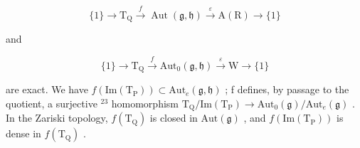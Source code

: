 \[
\{1 \} \longrightarrow \mathrm {T_ {Q}} \stackrel {{f}} {{\longrightarrow}} \operatorname{Aut} (\mathfrak {g}, \mathfrak {h}) \stackrel {{\varepsilon}} {{\longrightarrow}} \mathrm{A(R)} \longrightarrow \{1 \}
\]

and

\[
\{1 \} \longrightarrow \mathrm{T} _ {\mathrm{Q}} \stackrel {f} {\longrightarrow} \mathrm{Aut} _ {0} (\mathfrak {g}, \mathfrak {h}) \stackrel {\varepsilon} {\longrightarrow} \mathrm{W} \longrightarrow \{1 \}
\]

are exact. We have \(f(\mathrm{Im}(\mathrm{T}_{\mathrm{P}})) \subset \mathrm{Aut}_{e}(\mathfrak{g}, \mathfrak{h})\) ; f defines, by passage to the quotient, a surjective \(^{23}\) homomorphism \(\mathrm{T}_{\mathrm{Q}}/\mathrm{Im}(\mathrm{T}_{\mathrm{P}}) \to \mathrm{Aut}_{0}(\mathfrak{g})/\mathrm{Aut}_{e}(\mathfrak{g})\) . In the Zariski topology, \(f(\mathrm{T}_{\mathrm{Q}})\) is closed in \(\mathrm{Aut}(\mathfrak{g})\) , and \(f(\mathrm{Im}(\mathrm{T}_{\mathrm{P}}))\) is dense in \(f(\mathrm{T}_{\mathrm{Q}})\) .

